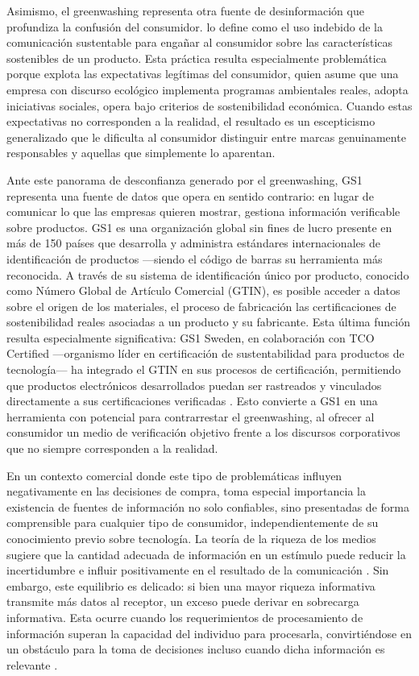 Asimismo, el greenwashing representa otra fuente de desinformación que
profundiza la confusión del consumidor. \textcite[p.~196]{font2025} lo define
como el uso indebido de la comunicación sustentable para engañar al consumidor
sobre las características sostenibles de un producto. Esta práctica resulta
especialmente problemática porque explota las expectativas legítimas del
consumidor, quien asume que una empresa con discurso ecológico implementa
programas ambientales reales, adopta iniciativas sociales, opera bajo criterios
de sostenibilidad económica. Cuando estas expectativas no corresponden a la
realidad, el resultado es un escepticismo generalizado que le dificulta al
consumidor distinguir entre marcas genuinamente responsables y aquellas que
simplemente lo aparentan. 

Ante este panorama de desconfianza generado por el greenwashing, GS1 representa
una fuente de datos que opera en sentido contrario: en lugar de comunicar lo que
las empresas quieren mostrar, gestiona información verificable sobre productos.
GS1 es una organización global sin fines de lucro presente en más de 150 países
que desarrolla y administra estándares internacionales de identificación de
productos —siendo el código de barras su herramienta más reconocida. A través de
su sistema de identificación único por producto, conocido como Número Global de
Artículo Comercial (GTIN), es posible acceder a datos sobre el origen de los
materiales, el proceso de fabricación las certificaciones de sostenibilidad
reales asociadas a un producto y su fabricante. Esta última función resulta
especialmente significativa: GS1 Sweden, en colaboración con TCO Certified
—organismo líder en certificación de sustentabilidad para productos de
tecnología— ha integrado el GTIN en sus procesos de certificación, permitiendo
que productos electrónicos desarrollados puedan ser rastreados y vinculados
directamente a sus certificaciones verificadas \parencite{gs12025}. Esto
convierte a GS1 en una herramienta con potencial para contrarrestar el
greenwashing, al ofrecer al consumidor un medio de verificación objetivo frente
a los discursos corporativos que no siempre corresponden a la realidad. 

En un contexto comercial donde este tipo de problemáticas influyen negativamente
en las decisiones de compra, toma especial importancia la existencia de fuentes
de información no solo confiables, sino presentadas de forma comprensible para
cualquier tipo de consumidor, independientemente de su conocimiento previo sobre
tecnología. La teoría de la riqueza de los medios sugiere que la cantidad
adecuada de información en un estímulo puede reducir la incertidumbre e influir
positivamente en el resultado de la comunicación \parencite[p.~197]{font2025}.
Sin embargo, este equilibrio es delicado: si bien una mayor riqueza informativa
transmite más datos al receptor, un exceso puede derivar en sobrecarga
informativa. Esta ocurre cuando los requerimientos de procesamiento de
información superan la capacidad del individuo para procesarla, convirtiéndose
en un obstáculo para la toma de decisiones incluso cuando dicha información es
relevante \parencite[p.~197]{font2025}.  

